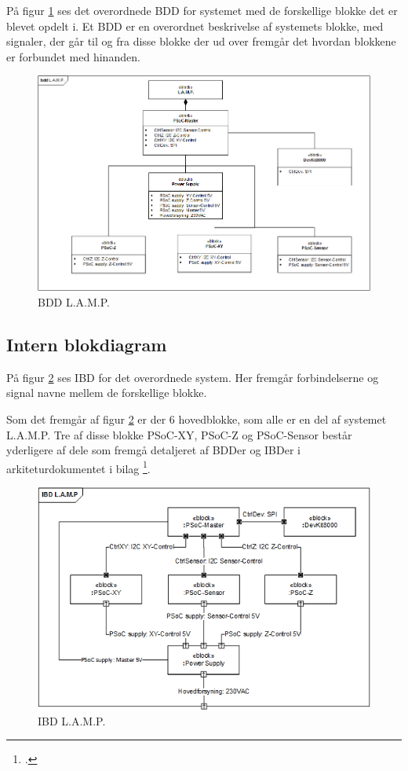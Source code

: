 På figur \ref{fig:bddLAMP} ses det overordnede BDD for systemet med de forskellige blokke det er blevet opdelt i. Et BDD er en overordnet beskrivelse af systemets blokke, med signaler, der går til og fra disse blokke der ud over fremgår det hvordan blokkene er forbundet med hinanden.

\begin{figure}[H] \centering
    \includegraphics[width=\textwidth]{Filer/bddLAMPvers2.png}
    \caption{BDD L.A.M.P.}
    \label{fig:bddLAMP}
\end{figure}


\subsection{Intern blokdiagram}

På figur \ref{fig:ibdLAMP} ses IBD for det overordnede system. Her fremgår forbindelserne og signal navne mellem de forskellige blokke.

Som det fremgår af figur \ref{fig:ibdLAMP} er der 6 hovedblokke, som alle er en del af systemet L.A.M.P. Tre af disse blokke PSoC-XY, PSoC-Z og PSoC-Sensor består yderligere af dele som fremgå detaljeret af BDDer og IBDer i arkiteturdokumentet i bilag \footcite{documentation}.

\begin{figure}[H] \centering
    \includegraphics[width=\textwidth]{Filer/ibdLAMPvers3.png}
    \caption{IBD L.A.M.P.}
    \label{fig:ibdLAMP}
\end{figure}

